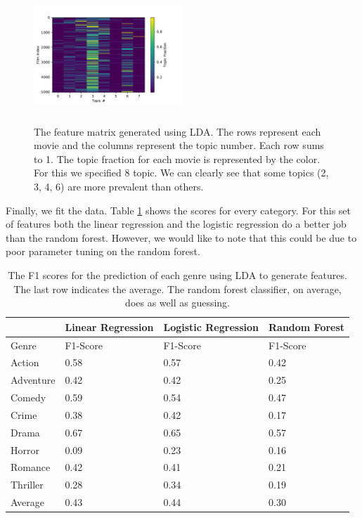 \documentclass[11pt]{article}
\begin{document}
\begin{figure}[ht]
	\centering
		\includegraphics[width=0.5\textwidth,height=5cm]{lda_features.pdf}
	\caption{The feature matrix generated using LDA. The rows represent each movie and the columns represent the topic number. Each row sums to 1. The topic fraction for each movie is represented by the color. For this we specified 8 topic. We can clearly see that some topics (2, 3, 4, 6) are more prevalent than others.}
	\label{fig:lda}
\end{figure}

Finally, we fit the data. Table \ref{tab:lda_scores} shows the scores for every category. For this set of features both the linear regression and the logistic regression do a better job than the random forest. However, we would like to note that this could be due to poor parameter tuning on the random forest.

\begin{table}[h]
	\label{tab:lda_scores}
\begin{center}
	\begin{tabular}{| l | l | l | l |}
		\hline
		           & Linear Regression & Logistic Regression & Random Forest \\
		\hline
		Genre      & F1-Score          & F1-Score            & F1-Score       \\
	  	\hline			
	  	Action     & 0.58              & 0.57                & 0.42 \\
	  	Adventure  & 0.42              & 0.42                & 0.25 \\ 
	  	Comedy     & 0.59              & 0.54                & 0.47 \\
	  	Crime      & 0.38              & 0.42                & 0.17 \\
	  	Drama      & 0.67              & 0.65                & 0.57 \\
	  	Horror     & 0.09              & 0.23                & 0.16 \\
	  	Romance    & 0.42              & 0.41                & 0.21 \\
	  	Thriller   & 0.28              & 0.34                & 0.19 \\
	  	\hline
	  	Average    & 0.43              & 0.44                & 0.30 \\
	  \hline  
	\end{tabular}
\end{center}
	\caption{The F1 scores for the prediction of each genre using LDA to generate features. The last row indicates the average. The random forest classifier, on average, does as well as guessing.}
\end{table}
\end{document}
